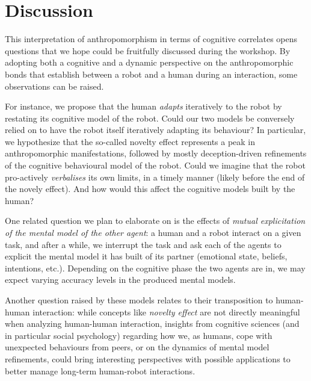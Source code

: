 \documentclass{frontiersSCNS} %
\begin{document}


%
%
%
%
%
%

\section{Discussion}

This interpretation of anthropomorphism in terms of cognitive correlates opens
questions that we hope could be fruitfully discussed during the workshop.  By
adopting both a cognitive and a dynamic perspective on the anthropomorphic bonds
that establish between a robot and a human during an interaction, some
observations can be raised.

For instance, we propose that the human \emph{adapts} iteratively to the robot
by restating its cognitive model of the robot. Could our two models be
conversely relied on to have the robot itself iteratively adapting its
behaviour? In particular, we hypothesize that the so-called novelty effect
represents a peak in anthropomorphic manifestations, followed by mostly
deception-driven refinements of the cognitive behavioural model of the robot.
Could we imagine that the robot pro-actively \emph{verbalises} its own limits,
in a timely manner (likely before the end of the novely effect). And how would
this affect the cognitive models built by the human?

One related question we plan to elaborate on is the effects of \emph{mutual
explicitation of the mental model of the other agent}: a human and a robot
interact on a given task, and after a while, we interrupt the task and ask each
of the agents to explicit the mental model it has built of its partner
(emotional state, beliefs, intentions, etc.). Depending on the cognitive phase
the two agents are in, we may expect varying accuracy levels in the produced
mental models.

Another question raised by these models relates to their transposition to
human-human interaction: while concepts like \emph{novelty effect} are not
directly meaningful when analyzing human-human interaction, insights from
cognitive sciences (and in particular social psychology) regarding how we, as
humans, cope with unexpected behaviours from peers, or on the dynamics of mental
model refinements, could bring interesting perspectives with possible
applications to better manage long-term human-robot interactions.
\end{document}
